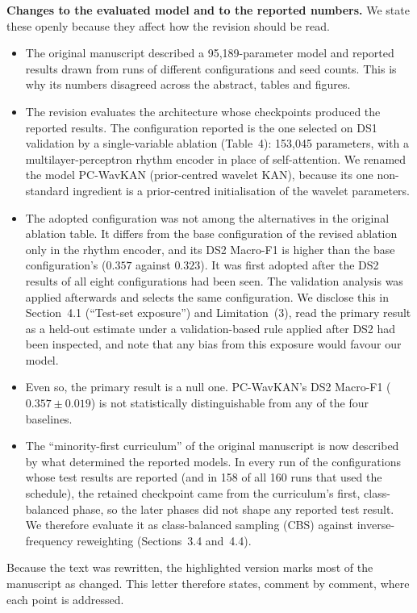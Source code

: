 \documentclass[11pt]{article}
\begin{document}
\textbf{Changes to the evaluated model and to the reported numbers.} We state these openly because they affect how the revision should be read.
\begin{itemize}[leftmargin=1.2em,itemsep=2pt]
\item The original manuscript described a 95,189-parameter model and reported results drawn from runs of different configurations and seed counts. This is why its numbers disagreed across the abstract, tables and figures.
\item The revision evaluates the architecture whose checkpoints produced the reported results. The configuration reported is the one selected on DS1 validation by a single-variable ablation (Table~4): 153,045 parameters, with a multilayer-perceptron rhythm encoder in place of self-attention. We renamed the model PC-WavKAN (prior-centred wavelet KAN), because its one non-standard ingredient is a prior-centred initialisation of the wavelet parameters.
\item The adopted configuration was not among the alternatives in the original ablation table. It differs from the base configuration of the revised ablation only in the rhythm encoder, and its DS2 Macro-F1 is higher than the base configuration's ($0.357$ against $0.323$). It was first adopted after the DS2 results of all eight configurations had been seen. The validation analysis was applied afterwards and selects the same configuration. We disclose this in Section~4.1 (``Test-set exposure'') and Limitation~(3), read the primary result as a held-out estimate under a validation-based rule applied after DS2 had been inspected, and note that any bias from this exposure would favour our model.
\item Even so, the primary result is a null one. PC-WavKAN's DS2 Macro-F1 ($0.357\pm0.019$) is not statistically distinguishable from any of the four baselines.
\item The ``minority-first curriculum'' of the original manuscript is now described by what determined the reported models. In every run of the configurations whose test results are reported (and in 158 of all 160 runs that used the schedule), the retained checkpoint came from the curriculum's first, class-balanced phase, so the later phases did not shape any reported test result. We therefore evaluate it as class-balanced sampling (CBS) against inverse-frequency reweighting (Sections~3.4 and~4.4).
\end{itemize}

Because the text was rewritten, the highlighted version marks most of the manuscript as changed. This letter therefore states, comment by comment, where each point is addressed.
\end{document}
